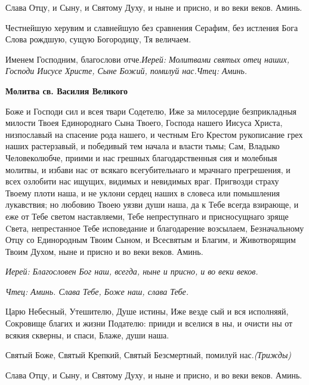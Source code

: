 \normalfont{}Слава Отцу, и Сыну, и Святому Духу, и ныне и присно, и во веки веков. Аминь.

Честнейшую херувим и славнейшую без сравнения Серафим, без истления Бога Слова рождшую, сущую Богородицу, Тя величаем.

Именем Господним, благослови отче.\itshape Иерей\normalfont{}: Молитвами святых отец наших, Господи Иисусе Христе, Сыне Божий, помилуй нас.\itshape Чтец\normalfont{}: Аминь.


\medskip
\bfseries Молитва св. Василия Великого\normalfont{}\nopagebreak

Боже и Господи сил и всея твари Содетелю, Иже за милосердие безприкладныя милости Твоея Единороднаго Сына Твоего, Господа нашего Иисуса Христа, низпославый на спасение рода нашего, и честным Его Крестом рукописание грех наших растерзавый, и победивый тем начала и власти тьмы; Сам, Владыко Человеколюбче, приими и нас грешных благодарственныя сия и молебныя молитвы, и избави нас от всякаго всегубительнаго и мрачнаго прегрешения, и всех озлобити нас ищущих, видимых и невидимых враг. Пригвозди страху Твоему плоти наша, и не уклони сердец наших в словеса или помышления лукавствия; но любовию Твоею уязви души наша, да к Тебе всегда взирающе, и еже от Тебе светом наставляеми, Тебе непреступнаго и присносущнаго зряще Cвета, непрестанное Тебе исповедание и благодарение возсылаем, Безначальному Отцу со Единородным Твоим Сыном, и Всесвятым и Благим, и Животворящим Твоим Духом, ныне и присно и во веки веков. Аминь.\nopagebreak\bigskip\bigskip\mychapterending

 


\itshape Иерей\normalfont{}: Благословен Бог наш, всегда, ныне и присно, и во веки веков.

\itshape Чтец\normalfont{}: Аминь. Слава Тебе, Боже наш, слава Тебе.



Царю Небесный, Утешителю, Душе истины, Иже везде сый и вся исполняяй, Сокровище благих и жизни Подателю: прииди и вселися в ны, и очисти ны от всякия скверны, и спаси, Блаже, души наша.



Святый Боже, Святый Крепкий, Святый Безсмертный, помилуй нас.\itshape  (Трижды)

\normalfont{}Слава Отцу, и Сыну, и Святому Духу, и ныне и присно, и во веки веков. Аминь.



